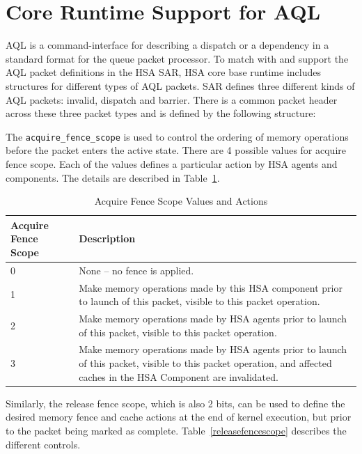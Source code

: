 \hypertarget{coreapi_AQL}{}\section{Core Runtime Support for
AQL}\label{AQL}
AQL is a command-interface for describing a dispatch or a dependency
in a standard format for the queue packet processor. 
To match with and support the AQL packet definitions in the HSA SAR,
HSA core base runtime includes structures for different types of AQL
packets.  SAR defines three different kinds of AQL packets: invalid,
dispatch and barrier.  There is a common packet header across these
three packet types and is defined by the following structure:



The \texttt{acquire\_fence\_scope} is used to control the ordering
of memory operations before the packet enters the active state.
There are 4 possible values for acquire fence scope. Each of the
values defines a particular action by HSA agents and components. The
details are described in Table~\ref{acquirefencescope}.

\begin{table}
  \begin{center}
          \begin{tabular}{|p{1in}|p{5in}|}
      \hline
      \textbf{Acquire Fence Scope} &\textbf{Description} \\ 
      \hline
      0	& None – no fence is applied. \\
      \hline
      1	& Make memory operations made by this HSA component prior to
      launch of this packet, visible to this packet operation.\\
      \hline
      2	& Make memory operations made by HSA agents prior to launch
      of this packet, visible to this packet operation.\\
      \hline
      3	& Make memory operations made by HSA agents prior to launch
      of this packet, visible to this packet operation, and affected
      caches in the HSA Component are invalidated.\\
      \hline
    \end{tabular}
  \end{center}
  \caption{Acquire Fence Scope Values and Actions}
  \label{acquirefencescope}
\end{table}

Similarly, the release fence scope, which is also 2 bits, can be
used to define the desired memory fence and cache actions at the
end of kernel execution, but prior to the packet being marked as
complete. Table~\ref{releasefencescope} describes the different
controls.

